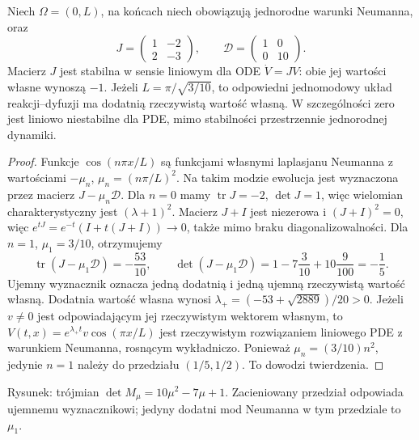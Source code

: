 \begin{stwierdzenie}
\label{prop:pde27-turing}
Niech $\Omega=(0,L)$, na końcach niech obowiązują
jednorodne warunki Neumanna, oraz
\[
 J=\begin{pmatrix}1&-2\\2&-3\end{pmatrix},\qquad
 \mathcal D=\begin{pmatrix}1&0\\0&10\end{pmatrix}.
\]
Macierz $J$ jest stabilna w sensie liniowym dla ODE
$\dot V=JV$: obie jej wartości własne wynoszą $-1$.
Jeżeli $L=\pi/\sqrt{3/10}$, to odpowiedni
jednomodowy układ reakcji--dyfuzji ma dodatnią
rzeczywistą wartość własną. W szczególności
zero jest liniowo niestabilne dla PDE, mimo
stabilności przestrzennie jednorodnej dynamiki.
\end{stwierdzenie}
\begin{proof}
Funkcje $\cos(n\pi x/L)$ są funkcjami własnymi
laplasjanu Neumanna z wartościami $-\mu_n$,
$\mu_n=(n\pi/L)^2$. Na takim modzie ewolucja
jest wyznaczona przez macierz $J-\mu_n\mathcal D$.
Dla $n=0$ mamy
$\operatorname{tr}J=-2$, $\det J=1$, więc
wielomian charakterystyczny jest $(\lambda+1)^2$.
Macierz $J+I$ jest niezerowa i $(J+I)^2=0$,
więc $e^{tJ}=e^{-t}(I+t(J+I))\to0$, także
mimo braku diagonalizowalności.
Dla $n=1$, $\mu_1=3/10$, otrzymujemy
\[
 \operatorname{tr}(J-\mu_1\mathcal D)=-\frac{53}{10},
 \qquad \det(J-\mu_1\mathcal D)
 =1-7\frac3{10}+10\frac9{100}=-\frac15.
\]
Ujemny wyznacznik oznacza jedną dodatnią i jedną
ujemną rzeczywistą wartość własną. Dodatnia wartość własna wynosi
$\lambda_+=(-53+\sqrt{2889})/20>0$.
Jeżeli $v\ne0$ jest odpowiadającym jej rzeczywistym
wektorem własnym, to
$V(t,x)=e^{\lambda_+t}v\cos(\pi x/L)$
jest rzeczywistym rozwiązaniem liniowego PDE
z warunkiem Neumanna, rosnącym wykładniczo.
Ponieważ $\mu_n=(3/10)n^2$, jedynie $n=1$
należy do przedziału $(1/5,1/2)$.
To dowodzi twierdzenia.
\end{proof}

\begin{center}

\small Rysunek: trójmian $\det M_\mu=10\mu^2-7\mu+1$.
Zacieniowany przedział odpowiada ujemnemu wyznacznikowi;
jedyny dodatni mod Neumanna w tym przedziale to $\mu_1$.
\end{center}

